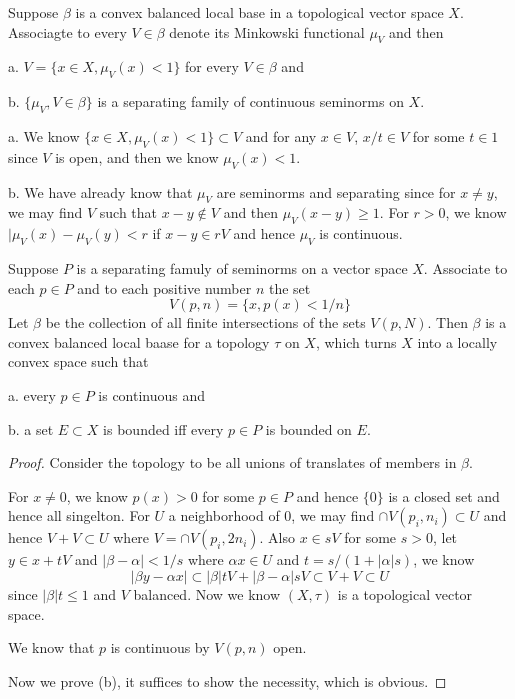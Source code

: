 \documentclass[lang=en, color=blue, ]{elegantbook}
\begin{document}
\begin{theorem}
    Suppose $\beta$ is a convex balanced local base in a topological vector space $X$. Associagte to every $V\in\beta$ denote its Minkowski functional $\mu_V$ and then\par
    a. $V = \{x\in X, \mu_V(x) < 1\}$ for every $V\in\beta$ and\par
    b. $\{\mu_V, V\in\beta\}$ is a separating family of continuous seminorms on $X$.
\end{theorem}
\begin{theorem}
    a. We know $\{x\in X, \mu_V(x) < 1\} \subset V$ and for any $x\in V$, $x/t \in V$ for some $t\in 1$ since $V$ is open, and then we know $\mu_V(x) < 1$.\par
    b. We have already know that $\mu_V$ are seminorms and separating since for $x\neq y$, we may find $V$ such that $x-y \notin V$ and then $\mu_V(x-y) \geq 1$. For $r>0$, we know $|\mu_V(x)-\mu_V(y) < r$ if $x-y \in rV$ and hence $\mu_V$ is continuous.
\end{theorem}

\begin{theorem}
    Suppose $P$ is a separating famuly of seminorms on a vector space $X$. Associate to each $p\in P$ and to each positive number $n$ the set
    \[V(p,n) = \{x, p(x)<1/n\}\]
    Let $\beta$ be the collection of all finite intersections of the sets $V(p,N)$. Then $\beta$ is a convex balanced local baase for a topology $\tau$ on $X$, which turns $X$ into a locally convex space such that\par
    a. every $p\in P$ is continuous and\par
    b. a set $E\subset X$ is bounded iff every $p\in P$ is bounded on $E$.
\end{theorem}
\begin{proof}
    Consider the topology to be all unions of translates of members in $\beta$.\par
    For $x\neq 0$, we know $p(x) > 0$ for some $p\in P$ and hence $\{0\}$ is a closed set and hence all singelton. For $U$ a neighborhood of $0$, we may find $\cap V(p_i,n_i) \subset U$ and hence $V+V\subset U$ where $V = \cap V(p_i,2n_i)$. Also $x\in sV$ for some $s>0$, let $y\in x+tV$ and $|\beta -\alpha| < 1/s$ where $\alpha x\in U$ and $t = s/(1+|\alpha| s)$, we know
    \[
    |\beta y - \alpha x| \subset |\beta|tV + |\beta-\alpha|sV \subset V+V\subset U
    \] 
    since $|\beta|t\leq 1$ and $V$ balanced. Now we know $(X,\tau)$ is a topological vector space.\par
    We know that $p$ is continuous by $V(p,n)$ open.\par
    Now we prove (b), it suffices to show the necessity, which is obvious.
\end{proof}
\end{document}
